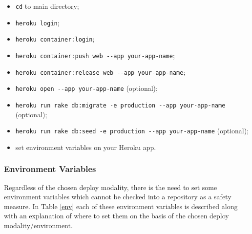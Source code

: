 \documentclass[a4paper, english]{article}
\newcounter{subsubsubsection}[subsubsection]
\begin{document}

\begin{itemize}
\item \verb|cd| to main directory;
\item \verb|heroku login|;
\item \verb|heroku container:login|;
\item \verb|heroku container:push web --app your-app-name|;
\item \verb|heroku container:release web --app your-app-name|;
\item \verb|heroku open --app your-app-name| (optional);
\item \verb|heroku run rake db:migrate -e production --app your-app-name| (optional);
\item \verb|heroku run rake db:seed -e production --app your-app-name| (optional);
\item set environment variables on your Heroku app.
\end{itemize}

\subsubsection{Environment Variables}

Regardless of the chosen deploy modality, there is the need to set some environment variables which cannot be checked into a repository as a safety measure. In Table \ref{env} each of these environment variables is described along with an explanation of where to set them on the basis of the chosen deploy modality/environment. 
\end{document}
